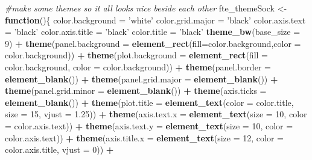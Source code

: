 \documentclass[]{article}
\newenvironment{Shaded}{\begin{snugshade}}{\end{snugshade}}
\newcommand{\KeywordTok}[1]{\textcolor[rgb]{0.13,0.29,0.53}{\textbf{#1}}}
\newcommand{\DataTypeTok}[1]{\textcolor[rgb]{0.13,0.29,0.53}{#1}}
\newcommand{\DecValTok}[1]{\textcolor[rgb]{0.00,0.00,0.81}{#1}}
\newcommand{\FloatTok}[1]{\textcolor[rgb]{0.00,0.00,0.81}{#1}}
\newcommand{\StringTok}[1]{\textcolor[rgb]{0.31,0.60,0.02}{#1}}
\newcommand{\CommentTok}[1]{\textcolor[rgb]{0.56,0.35,0.01}{\textit{#1}}}
\newcommand{\ControlFlowTok}[1]{\textcolor[rgb]{0.13,0.29,0.53}{\textbf{#1}}}
\newcommand{\OperatorTok}[1]{\textcolor[rgb]{0.81,0.36,0.00}{\textbf{#1}}}
\newcommand{\NormalTok}[1]{#1}
\begin{document}
\begin{Shaded}
\begin{Highlighting}[]
\CommentTok{#make some themes so it all looks nice beside each other}
\NormalTok{fte_themeSock <-}\StringTok{ }\ControlFlowTok{function}\NormalTok{()\{}
\NormalTok{  color.background =}\StringTok{ 'white'}
\NormalTok{  color.grid.major =}\StringTok{ 'black'}
\NormalTok{  color.axis.text =}\StringTok{ 'black'}
\NormalTok{  color.axis.title =}\StringTok{ 'black'}
\NormalTok{  color.title =}\StringTok{ 'black'}
  \KeywordTok{theme_bw}\NormalTok{(}\DataTypeTok{base_size =} \DecValTok{9}\NormalTok{) }\OperatorTok{+}\StringTok{ }
\StringTok{    }\KeywordTok{theme}\NormalTok{(}\DataTypeTok{panel.background =} \KeywordTok{element_rect}\NormalTok{(}\DataTypeTok{fill=}\NormalTok{color.background,}\DataTypeTok{color =}\NormalTok{ color.background)) }\OperatorTok{+}
\StringTok{    }\KeywordTok{theme}\NormalTok{(}\DataTypeTok{plot.background =} \KeywordTok{element_rect}\NormalTok{(}\DataTypeTok{fill =}\NormalTok{ color.background, }\DataTypeTok{color =}\NormalTok{ color.background)) }\OperatorTok{+}
\StringTok{    }\KeywordTok{theme}\NormalTok{(}\DataTypeTok{panel.border =} \KeywordTok{element_blank}\NormalTok{()) }\OperatorTok{+}
\StringTok{    }\KeywordTok{theme}\NormalTok{(}\DataTypeTok{panel.grid.major =} \KeywordTok{element_blank}\NormalTok{()) }\OperatorTok{+}\StringTok{ }
\StringTok{    }\KeywordTok{theme}\NormalTok{(}\DataTypeTok{panel.grid.minor =} \KeywordTok{element_blank}\NormalTok{()) }\OperatorTok{+}\StringTok{ }
\StringTok{    }\KeywordTok{theme}\NormalTok{(}\DataTypeTok{axis.ticks =} \KeywordTok{element_blank}\NormalTok{()) }\OperatorTok{+}
\StringTok{    }\KeywordTok{theme}\NormalTok{(}\DataTypeTok{plot.title =} \KeywordTok{element_text}\NormalTok{(}\DataTypeTok{color =}\NormalTok{ color.title, }\DataTypeTok{size =} \DecValTok{15}\NormalTok{, }\DataTypeTok{vjust =} \FloatTok{1.25}\NormalTok{)) }\OperatorTok{+}
\StringTok{    }\KeywordTok{theme}\NormalTok{(}\DataTypeTok{axis.text.x =} \KeywordTok{element_text}\NormalTok{(}\DataTypeTok{size =} \DecValTok{10}\NormalTok{, }\DataTypeTok{color =}\NormalTok{ color.axis.text)) }\OperatorTok{+}\StringTok{ }
\StringTok{    }\KeywordTok{theme}\NormalTok{(}\DataTypeTok{axis.text.y =} \KeywordTok{element_text}\NormalTok{(}\DataTypeTok{size =} \DecValTok{10}\NormalTok{, }\DataTypeTok{color =}\NormalTok{ color.axis.text)) }\OperatorTok{+}\StringTok{ }
\StringTok{    }\KeywordTok{theme}\NormalTok{(}\DataTypeTok{axis.title.x =} \KeywordTok{element_text}\NormalTok{(}\DataTypeTok{size =} \DecValTok{12}\NormalTok{, }\DataTypeTok{color =}\NormalTok{ color.axis.title, }\DataTypeTok{vjust =} \DecValTok{0}\NormalTok{)) }\OperatorTok{+}

\end{Highlighting}
\end{Shaded}
\end{document}
